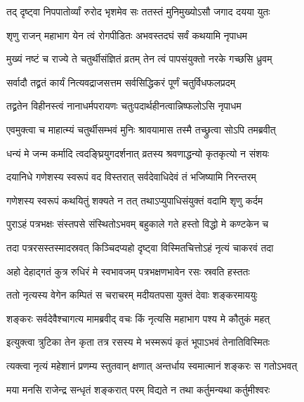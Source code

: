 \twolineshloka
{तद् दृष्ट्वा निपपातोर्व्यां रुरोद भृशमेव सः}
{ततस्तं मुनिमुख्योऽसौ जगाद दयया युतः} %


\twolineshloka
{श‍ृणु राजन् महाभाग येन त्वं रोगपीडितः}
{अभवस्तदघं सर्वं कथयामि नृपाधम} %

\twolineshloka
{मुख्यं नष्टं च राज्ये ते चतुर्थीसंज्ञितं व्रतम्}
{तेन त्वं पापसंयुक्तो नरके गच्छसि ध्रुवम्} %

\twolineshloka
{सर्वादौ तद्व्रतं कार्यं नित्यवद्राजसत्तम}
{सर्वसिद्धिकरं पूर्णं चतुर्विधफलप्रदम्} %

\twolineshloka
{तद्व्रतेन विहीनस्त्वं नानाधर्मपरायणः}
{चतुःपदार्थहीनत्वान्निष्फलोऽसि नृपाधम} %

\twolineshloka
{एवमुक्त्वा च माहात्म्यं चतुर्थीसम्भवं मुनिः}
{श्रावयामास तस्मै तच्छ्रुत्वा सोऽपि तमब्रवीत्} %


\twolineshloka
{धन्यं मे जन्म कर्मादि त्वदङ्घ्रियुगदर्शनात्}
{व्रतस्य श्रवणाद्धन्यो कृतकृत्यो न संशयः} %

\twolineshloka
{दयानिधे गणेशस्य स्वरूपं वद विस्तरात्}
{सर्वदेवाधिदेवं तं भजिष्यामि निरन्तरम्} %


\twolineshloka
{गणेशस्य स्वरूपं कथयितुं शक्यते न तत्}
{तथाऽप्युपाधिसंयुक्तं वदामि श‍ृणु कर्दम} %

\twolineshloka
{पुराऽहं पत्रभक्षः संस्तपसे संस्थितोऽभवम्}
{बहुकाले गते हस्तो विद्धो मे कण्टकेन च} %

\twolineshloka
{तदा पत्ररसस्तस्मादस्रवत् किञ्चिदप्यहो}
{दृष्ट्वा विस्मितचित्तोऽहं नृत्यं चाकरवं तदा} %

\twolineshloka
{अहो देहाद्गतं कुत्र रुधिरं मे स्वभावजम्}
{पत्रभक्षणभावेन रसः स्रवति हस्ततः} %

\twolineshloka
{ततो नृत्यस्य वेगेन कम्पितं स चराचरम्}
{मदीयतपसा युक्तं देवाः शङ्करमाययुः} %

\twolineshloka
{शङ्करः सर्वदेवैश्चागत्य मामब्रवीद् वचः}
{किं नृत्यसि महाभाग पश्य मे कौतुकं महत्} %

\twolineshloka
{इत्युक्त्वा त्रुटिका तेन कृता तत्र रसस्य मे}
{भस्मरूपं कृतं भूपाऽभवं तेनातिविस्मितः} %

\twolineshloka
{त्यक्त्वा नृत्यं महेशानं प्रणम्य स्तुतवान् क्षणात्}
{अन्तर्धाय स्वमात्मानं शङ्करः स गतोऽभवत्} %

\twolineshloka
{मया मनसि राजेन्द्र सन्धृतं शङ्करात् परम्}
{विद्यते न तथा कर्तुमन्यथा कर्तुमीश्वरः} %

